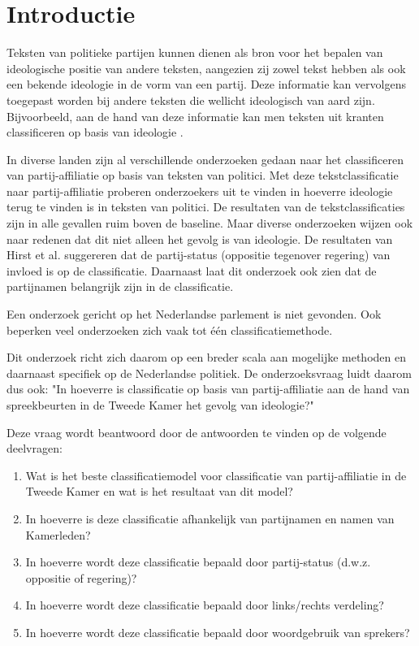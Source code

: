\section{Introductie}
\label{sec:intro}
Teksten van politieke partijen kunnen dienen als bron voor het bepalen van ideologische positie van andere teksten, aangezien zij zowel tekst hebben als ook een bekende ideologie in de vorm van een partij. Deze informatie kan vervolgens toegepast worden bij andere teksten die wellicht ideologisch van aard zijn. Bijvoorbeeld, aan de hand van deze informatie kan men teksten uit kranten classificeren op basis van ideologie \cite{DBLP:journals/corr/Biessmann16,Hirst_textto}.\par
In diverse landen zijn al verschillende onderzoeken gedaan naar het classificeren van partij-affiliatie op basis van teksten van politici\cite{Ferreira2016UsingTT,DBLP:journals/corr/Biessmann16}. Met deze tekstclassificatie naar partij-affiliatie proberen onderzoekers uit te vinden in hoeverre ideologie terug te vinden is in teksten van politici. De resultaten van de tekstclassificaties zijn in alle gevallen ruim boven de baseline. Maar diverse onderzoeken wijzen ook naar redenen dat dit niet alleen het gevolg is van ideologie.
De resultaten van Hirst et al. \cite{Hirst_textto} suggereren dat de partij-status (oppositie tegenover regering) van invloed is op de classificatie. Daarnaast laat dit onderzoek ook zien dat de partijnamen belangrijk zijn in de classificatie.\par
Een onderzoek gericht op het Nederlandse parlement is niet gevonden. Ook beperken veel onderzoeken zich vaak tot één classificatiemethode.\par
Dit onderzoek richt zich daarom op een breder scala aan mogelijke methoden en daarnaast specifiek op de Nederlandse politiek. De onderzoeksvraag luidt daarom dus ook: "In hoeverre is classificatie op basis van partij-affiliatie aan de hand van spreekbeurten in de Tweede Kamer het gevolg van ideologie?"\par
Deze vraag wordt beantwoord door de antwoorden te vinden op de volgende deelvragen:
\begin{enumerate}
    \item Wat is het beste classificatiemodel voor classificatie van partij-affiliatie in de Tweede Kamer en wat is het resultaat van dit model?
    \item In hoeverre is deze classificatie afhankelijk van partijnamen en namen van Kamerleden?
    \item In hoeverre wordt deze classificatie bepaald door partij-status (d.w.z. oppositie of regering)?
    \item In hoeverre wordt deze classificatie bepaald door links/rechts verdeling?
    \item In hoeverre wordt deze classificatie bepaald door woordgebruik van sprekers?
\end{enumerate}
